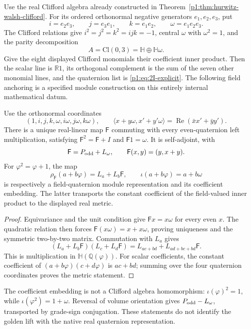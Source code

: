\documentclass[11pt]{article}
\begin{document}
Use the real Clifford algebra already constructed in
Theorem~\ref{p1:thm:hurwitz-walsh-clifford}.  For its ordered orthonormal
negative generators \(e_1,e_2,e_3\), put
\[
 i=e_2e_3,\qquad j=e_3e_1,\qquad k=e_1e_2,\qquad
 \omega=e_1e_2e_3.
\]
The Clifford relations give \(i^2=j^2=k^2=ijk=-1\), central
\(\omega\) with \(\omega^2=1\), and the parity decomposition
\[
 A=\mathrm{Cl}(0,3)=\mathbb H\oplus\mathbb H\omega.
\]
Give the eight displayed Clifford monomials their coefficient inner product.
Then the scalar line is \(\mathbb R1\), its orthogonal complement is the
sum of the seven other monomial lines, and the quaternion list is
\eqref{p1:eq:2I-explicit}.  The following field anchoring is a specified
module construction on this entirely internal mathematical datum.

\begin{proposition}
\label{p1:prop:exroot-golden-action}
Use the orthonormal coordinates
\[
 (1,i,j,k,\omega,i\omega,j\omega,k\omega),\qquad
 \langle x+y\omega,x'+y'\omega\rangle
 =\operatorname{Re}(\bar x x'+\bar y y').
\]
There is a unique real-linear map \(\mathsf F\) commuting with every
even-quaternion left multiplication, satisfying
\(\mathsf F^2=\mathsf F+I\) and \(\mathsf F1=\omega\). It is self-adjoint,
with
\[
 \mathsf F=P_{\rm odd}+L_\omega,\qquad
 \mathsf F(x,y)=(y,x+y).
\]
For \(\varphi^2=\varphi+1\), the map
\[
 \rho_{\mathsf F}(a+b\varphi)=L_a+L_b\mathsf F,\qquad
 \iota(a+b\varphi)=a+b\omega
\]
is respectively a field-quaternion module representation and its
coefficient embedding. The latter transports the constant coefficient
of the field-valued inner product to the displayed real metric.
\end{proposition}
\begin{proof}
Equivariance and the unit condition give \(\mathsf F x=x\omega\)
for every even \(x\). The quadratic relation then forces
\(\mathsf F(x\omega)=x+x\omega\), proving uniqueness and the symmetric
two-by-two matrix. Commutation with \(L_a\) gives
\[
 (L_a+L_b\mathsf F)(L_c+L_d\mathsf F)
 =L_{ac+bd}+L_{ad+bc+bd}\mathsf F.
\]
This is multiplication in \(\mathbb H(\mathbb Q(\varphi))\).
For scalar coefficients, the constant coefficient of
\((a+b\varphi)(c+d\varphi)\) is \(ac+bd\); summing over the four
quaternion coordinates proves the metric statement.
\end{proof}

The coefficient embedding is not a Clifford algebra homomorphism:
\(\iota(\varphi)^2=1\), while \(\iota(\varphi^2)=1+\omega\).
Reversal of volume orientation gives
\(P_{\rm odd}-L_\omega\), transported by grade-sign conjugation.
These statements do not identify the golden lift with the native real
quaternion representation.
\end{document}
